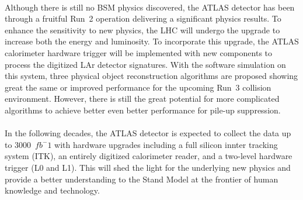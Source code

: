 \\Although there is still no BSM physics discovered, the ATLAS detector has been through a fruitful Run~2 operation delivering a significant physics results. To enhance the sensitivity to new physics, the LHC will undergo the upgrade to increase both the energy and luminosity. To incorporate this upgrade, the ATLAS calorimeter hardware trigger will be implemented with new components to process the digitized LAr detector signatures. With the software simulation on this system, three physical object reconstruction algorithms are proposed showing great the same or improved performance for the upcoming Run~3 collision environment. However, there is still the great potential for more complicated algorithms to achieve better even better performance for pile-up suppression. 
\\
\\In the following decades, the ATLAS detector is expected to collect the data up to 3000~$fb^-1$ with hardware upgrades including a full silicon innter tracking system (ITK), an entirely digitized calorimeter reader, and a two-level hardware trigger (L0 and L1). This will shed the light for the underlying new physics and provide a better understanding to the Stand Model at the frontier of human knowledge and technology. 
\newpage
{}